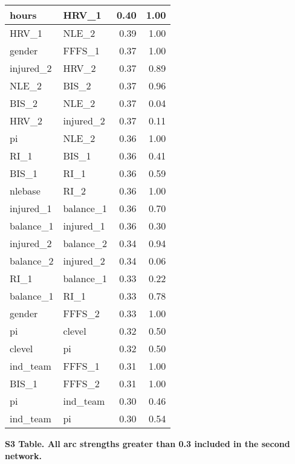 \documentclass[
]{article}
\begin{document}
\begin{longtable}[t]{l|l|r|r}
\hline
hours & HRV\_1 & 0.40 & 1.00\\
\hline
HRV\_1 & NLE\_2 & 0.39 & 1.00\\
\hline
gender & FFFS\_1 & 0.37 & 1.00\\
\hline
injured\_2 & HRV\_2 & 0.37 & 0.89\\
\hline
NLE\_2 & BIS\_2 & 0.37 & 0.96\\
\hline
BIS\_2 & NLE\_2 & 0.37 & 0.04\\
\hline
HRV\_2 & injured\_2 & 0.37 & 0.11\\
\hline
pi & NLE\_2 & 0.36 & 1.00\\
\hline
RI\_1 & BIS\_1 & 0.36 & 0.41\\
\hline
BIS\_1 & RI\_1 & 0.36 & 0.59\\
\hline
nlebase & RI\_2 & 0.36 & 1.00\\
\hline
injured\_1 & balance\_1 & 0.36 & 0.70\\
\hline
balance\_1 & injured\_1 & 0.36 & 0.30\\
\hline
injured\_2 & balance\_2 & 0.34 & 0.94\\
\hline
balance\_2 & injured\_2 & 0.34 & 0.06\\
\hline
RI\_1 & balance\_1 & 0.33 & 0.22\\
\hline
balance\_1 & RI\_1 & 0.33 & 0.78\\
\hline
gender & FFFS\_2 & 0.33 & 1.00\\
\hline
pi & clevel & 0.32 & 0.50\\
\hline
clevel & pi & 0.32 & 0.50\\
\hline
ind\_team & FFFS\_1 & 0.31 & 1.00\\
\hline
BIS\_1 & FFFS\_2 & 0.31 & 1.00\\
\hline
pi & ind\_team & 0.30 & 0.46\\
\hline
ind\_team & pi & 0.30 & 0.54\\
\hline
\end{longtable}

\clearpage
\newpage

\textbf{S3 Table. All arc strengths greater than 0.3 included in the second network.}
\end{document}
